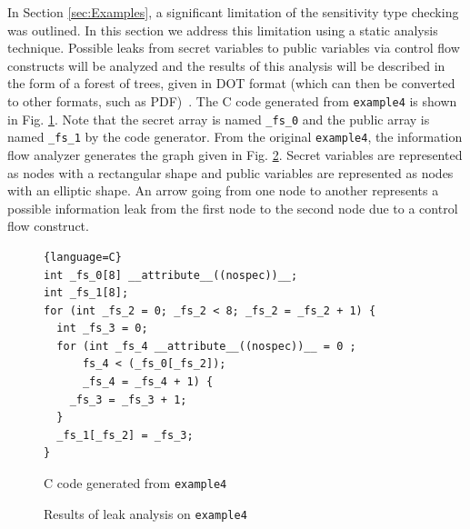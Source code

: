 \documentclass[10pt, conference]{IEEEtran}
\newcommand{\ttt}{\texttt}
\begin{document}
In Section \ref{sec:Examples}, a significant limitation of the sensitivity type checking
was outlined. In this section we address this limitation using a static analysis technique.
Possible leaks from secret variables to public variables via control flow constructs will
be analyzed and the results of this analysis will be described in the form of
a forest of trees, given in DOT format (which can then be converted to other formats,
such as PDF)~\cite{DOT}. The C code generated from \ttt{example4} is shown in Fig. \ref{fig:GenC4}.
Note that the secret array is named \verb|_fs_0| and the public array is named \verb|_fs_1| by the
code generator. From the original \ttt{example4}, the information flow analyzer generates the
graph given in Fig. \ref{fig:Analysis4}. Secret variables are represented as nodes with
a rectangular shape and public variables are represented as nodes with an elliptic shape. An
arrow going from one node to another represents a possible information leak from the first
node to the second node due to a control flow construct.

\begin{figure}
\begin{lstlisting}{language=C}
int _fs_0[8] __attribute__((nospec))__;
int _fs_1[8];
for (int _fs_2 = 0; _fs_2 < 8; _fs_2 = _fs_2 + 1) {
  int _fs_3 = 0;
  for (int _fs_4 __attribute__((nospec))__ = 0 ;
      fs_4 < (_fs_0[_fs_2]);
      _fs_4 = _fs_4 + 1) {
    _fs_3 = _fs_3 + 1;
  }
  _fs_1[_fs_2] = _fs_3;
}
\end{lstlisting}
\caption{C code generated from \ttt{example4}}
\label{fig:GenC4}
\end{figure}

\begin{figure}
\centering
\caption{Results of leak analysis on \ttt{example4}}
\label{fig:Analysis4}
\end{figure}
\end{document}
